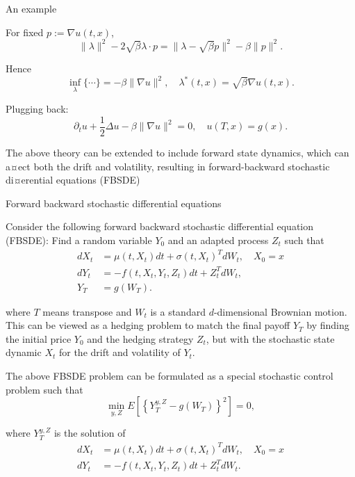 \documentclass{beamer}
\begin{document}
\begin{frame}{An example}

    {\footnotesize \footnotesize
    For fixed \(p := \nabla u(t, x)\),
\[
\|\lambda\|^2 - 2\sqrt{\beta} \lambda \cdot p = \|\lambda - \sqrt{\beta} p\|^2 - \beta \|p\|^2.
\]

Hence
\[
\inf_\lambda \{ \cdots \} = -\beta \|\nabla u\|^2, \quad \lambda^*(t, x) = \sqrt{\beta} \nabla u(t, x).
\]

 \pause Plugging back:
\[
\partial_t u + \frac{1}{2} \Delta u - \beta \|\nabla u\|^2 = 0, \quad u(T, x) = g(x). 
\]
\vspace{1em}
\par The above theory can be extended to include forward state dynamics, which
can a¤ect both the drift and volatility, resulting in forward-backward stochastic
di¤erential equations (FBSDE)
    }
    
\end{frame}
\begin{frame}{Forward backward stochastic differential equations}

    {\footnotesize \footnotesize
    Consider the following forward backward stochastic differential equation (FBSDE): Find a random variable \( Y_0 \) and an adapted process \( Z_t \) such that
    \begin{align*}
        dX_t &= \mu(t, X_t)dt + \sigma(t, X_t)^T dW_t, \quad X_0 = x\\
        dY_t &= -f(t, X_t, Y_t, Z_t)dt + Z_t^T dW_t,\\
        Y_T &= g(W_T).
    \end{align*}

    \par where \( T \) means transpose and \( W_t \) is a standard \( d \)-dimensional Brownian motion. 
    This can be viewed as a hedging problem to match the final payoff \( Y_T \) by finding the initial price 
    \( Y_0 \) and the hedging strategy \( Z_t \), 
    but with the stochastic state dynamic \( X_t \) for the drift and volatility of \( Y_t \).
    \vspace{1em}
    \par  \pause The above FBSDE problem can be formulated as a special stochastic control problem such that
\[
\min_{y,Z} E \left[ \left\{ Y_T^{y,Z} - g(W_T) \right\}^2 \right] = 0,
\]

where \( Y_T^{y,Z} \) is the solution of
\begin{align*}
    dX_t &= \mu(t, X_t)dt + \sigma(t, X_t)^T dW_t, \quad X_0 = x\\
    dY_t &= -f(t, X_t, Y_t, Z_t)dt + Z_t^T dW_t.
\end{align*}

    }
    
\end{frame}
\end{document}
